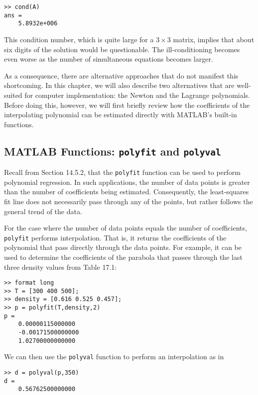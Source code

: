 \documentclass[../main.tex]{subfiles}
\begin{document}
\begin{lstlisting}[numbers=none]
	>> cond(A)
ans =
	5.8932e+006
\end{lstlisting}

This condition number, which is quite large for a $3 \times 3$ matrix, implies that about six digits
of the solution would be questionable. The ill-conditioning becomes even worse as the
number of simultaneous equations becomes larger.

As a consequence, there are alternative approaches that do not manifest this shortcoming. In this chapter, we will also describe two alternatives that are well-suited for
computer implementation: the Newton and the Lagrange polynomials. Before doing this,
however, we will first briefly review how the coefficients of the interpolating polynomial
can be estimated directly with MATLAB's built-in functions.

\label{cha:cha_P_17_1_2}
\subsection{MATLAB Functions: \texttt{polyfit} and \texttt{polyval}}

\noindent Recall from Section 14.5.2, that the \texttt{polyfit} function can be used to perform polynomial
regression. In such applications, the number of data points is greater than the number of
coefficients being estimated. Consequently, the least-squares fit line does not necessarily
pass through any of the points, but rather follows the general trend of the data.

For the case where the number of data points equals the number of coefficients, \texttt{polyfit} performs interpolation. That is, it returns the coefficients of the polynomial that pass
directly through the data points. For example, it can be used to determine the coefficients
of the parabola that passes through the last three density values from Table 17.1:

\begin{lstlisting}[numbers=none]
>> format long
>> T = [300 400 500];
>> density = [0.616 0.525 0.457];
>> p = polyfit(T,density,2)
p =
	0.00000115000000
	-0.00171500000000
	1.02700000000000
\end{lstlisting}

\noindent We can then use the \texttt{polyval} function to perform an interpolation as in

\begin{lstlisting}[numbers=none]
>> d = polyval(p,350)
d =
	0.56762500000000
\end{lstlisting}
\end{document}
